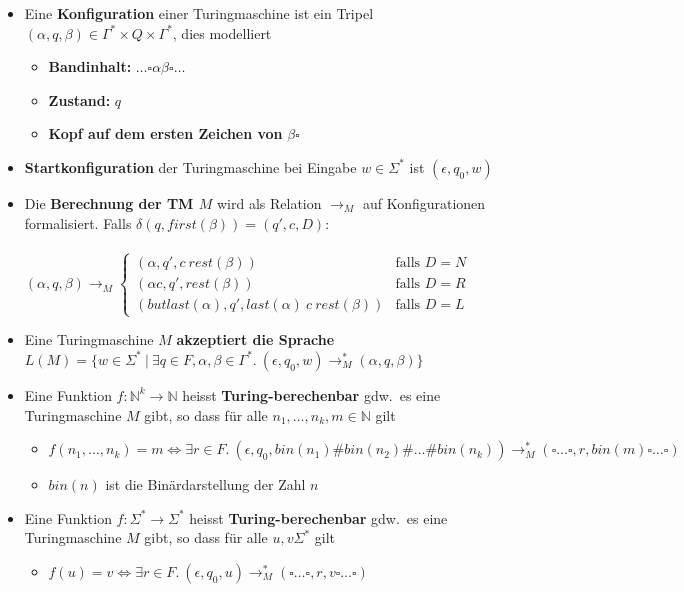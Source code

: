 \documentclass[ieeetran]{article}
\begin{document}
\begin{itemize}
	\item Eine \textbf{Konfiguration} einer Turingmaschine ist ein Tripel $(\alpha, q, \beta) \in \Gamma^* \times Q \times \Gamma^*$, dies modelliert
		\begin{itemize}
		  \item \textbf{Bandinhalt:} $\ldots \square \alpha \beta \square \ldots$

		\item \textbf{Zustand:} $q$
		\item \textbf{Kopf auf dem ersten Zeichen von} $\beta \square$
		\end{itemize}
		\item \textbf{Startkonfiguration} der Turingmaschine bei Eingabe $w \in \Sigma^*$ ist $(\epsilon, q_0, w)$
		\item Die \textbf{Berechnung der TM $M$} wird als Relation $\rightarrow_M$ auf Konfigurationen formalisiert. Falls $\delta(q,first(\beta)) = (q',c , D)$:
\\ \\ \begin{math}
		(\alpha,q,\beta) \rightarrow_M \left\{
			\begin{array}{ll}
				(\alpha,q',c \ rest(\beta)) & \mbox{falls $D = N$}\\
				(\alpha c, q', rest(\beta)) & \mbox{falls $D = R$}\\

				(butlast(\alpha),q',last(\alpha) \ c \ rest(\beta)) & \mbox{falls $D = L$}
		\end{array}
		\right.
	\end{math}

\item Eine Turingmaschine $M$ \textbf{akzeptiert die Sprache} $L(M) = \{w \in \Sigma^* \ | \ \exists q \in F, \alpha, \beta \in \Gamma^*. \ (\epsilon,q_0,w) \rightarrow^*_M (\alpha,q,\beta)\}$
\item Eine Funktion $f:\mathbb{N}^k \rightarrow \mathbb{N}$ heisst \textbf{Turing-berechenbar} gdw.\ es eine Turingmaschine $M$ gibt, so dass für alle $n_1, \ldots, n_k, m \in \mathbb{N}$ gilt
	\begin{itemize}
	  \item $f(n_1, \ldots, n_k) = m \Leftrightarrow \exists r \in F. \ (\epsilon, q_0, bin(n_1)\#bin(n_2)\#\ldots\#bin(n_k)) \rightarrow_M^* (\square \ldots \square,r,bin(m)\square \ldots \square)$
		  \item $bin(n)$ ist die Binärdarstellung der Zahl $n$
	\end{itemize}
	\item Eine Funktion $f:\Sigma^* \rightarrow \Sigma^*$ heisst \textbf{Turing-berechenbar} gdw.\ es eine Turingmaschine $M$ gibt, so dass für alle $u,v\Sigma^*$ gilt
		\begin{itemize}
		  \item $f(u) = v \Leftrightarrow \exists r \in F. \ (\epsilon, q_0, u) \rightarrow_M^* (\square \ldots \square ,r,v \square \ldots \square)$
		\end{itemize}
\end{itemize}
\end{document}
